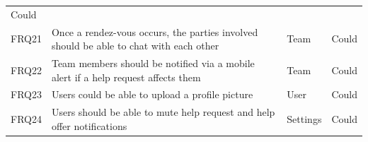 \documentclass[12pt]{report}
\begin{document}
\begin{longtable}[]{@{}llll@{}}
\begin{minipage}[t]{0.09\columnwidth}
Could\strut
\end{minipage}\tabularnewline
\begin{minipage}[t]{0.04\columnwidth}\raggedright\strut
FRQ21\strut
\end{minipage} & \begin{minipage}[t]{0.64\columnwidth}\raggedright\strut
Once a rendez-vous occurs, the parties involved should be able to chat
with each other\strut
\end{minipage} & \begin{minipage}[t]{0.12\columnwidth}\raggedright\strut
Team\strut
\end{minipage} & \begin{minipage}[t]{0.09\columnwidth}\raggedright\strut
Could\strut
\end{minipage}\tabularnewline
\begin{minipage}[t]{0.04\columnwidth}\raggedright\strut
FRQ22\strut
\end{minipage} & \begin{minipage}[t]{0.64\columnwidth}\raggedright\strut
Team members should be notified via a mobile alert if a help request
affects them\strut
\end{minipage} & \begin{minipage}[t]{0.12\columnwidth}\raggedright\strut
Team\strut
\end{minipage} & \begin{minipage}[t]{0.09\columnwidth}\raggedright\strut
Could\strut
\end{minipage}\tabularnewline
\begin{minipage}[t]{0.04\columnwidth}\raggedright\strut
FRQ23\strut
\end{minipage} & \begin{minipage}[t]{0.64\columnwidth}\raggedright\strut
Users could be able to upload a profile picture\strut
\end{minipage} & \begin{minipage}[t]{0.12\columnwidth}\raggedright\strut
User\strut
\end{minipage} & \begin{minipage}[t]{0.09\columnwidth}\raggedright\strut
Could\strut
\end{minipage}\tabularnewline
\begin{minipage}[t]{0.04\columnwidth}\raggedright\strut
FRQ24\strut
\end{minipage} & \begin{minipage}[t]{0.64\columnwidth}\raggedright\strut
Users should be able to mute help request and help offer
notifications\strut
\end{minipage} & \begin{minipage}[t]{0.12\columnwidth}\raggedright\strut
Settings\strut
\end{minipage} & \begin{minipage}[t]{0.09\columnwidth}\raggedright\strut
Could\strut
\end{minipage}\tabularnewline
\bottomrule
\end{longtable}
\end{document}
